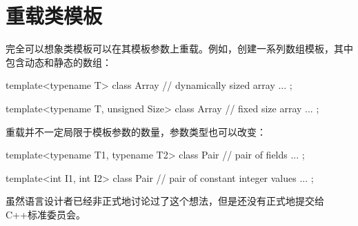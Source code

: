 \section{重载类模板}
完全可以想象类模板可以在其模板参数上重载。例如，创建一系列数组模板，其中包含动态和静态的数组：

\begin{cpp}
template<typename T>
class Array {
	// dynamically sized array
	...
};

template<typename T, unsigned Size>
class Array {
	// fixed size array
	...
};
\end{cpp}

重载并不一定局限于模板参数的数量，参数类型也可以改变：

\begin{cpp}
template<typename T1, typename T2>
class Pair {
	// pair of fields
	...
};

template<int I1, int I2>
class Pair {
	// pair of constant integer values
	...
};
\end{cpp}

虽然语言设计者已经非正式地讨论过了这个想法，但是还没有正式地提交给C++标准委员会。












































